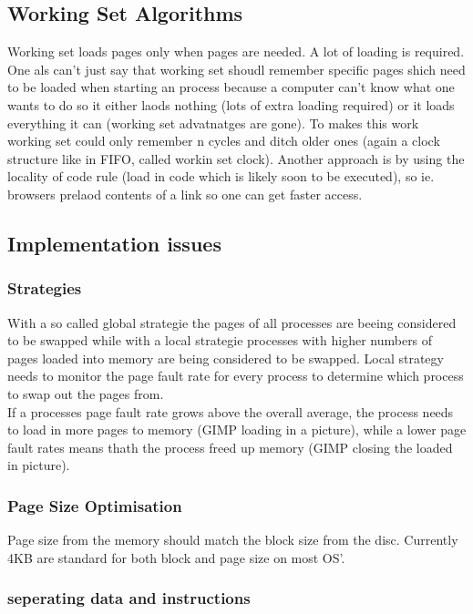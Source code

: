 \documentclass[a4paper]{scrartcl}
\begin{document}
                \subsection{Working Set Algorithms}
                    Working set loads pages only when pages are needed. A lot of loading is required. One als can't just say that working set shoudl remember
                    specific pages shich need to be loaded when starting an process because a computer can't know what one wants to do so it either laods 
                    nothing (lots of extra loading required) or it loads everything it can (working set advatnatges are gone). To makes this work working set could
                    only remember n cycles and ditch older ones (again  a clock structure like in FIFO, called workin set clock). Another approach is by using the 
                    locality of code rule (load in code which is likely soon to be  executed), so ie. browsers prelaod contents of a link so one can get faster access.
                \subsection{Implementation issues}
                    \subsubsection{Strategies}
                    With a so called global strategie the pages of all processes are beeing considered to be swapped while with a local strategie processes with higher
                    numbers of pages loaded into memory are being considered to be swapped. Local strategy needs to monitor the page fault rate for every process to  determine
                    which process to swap out the pages from. \\
                    If a processes page fault rate grows above the overall average, the process needs to load in more pages to memory (GIMP loading in a picture), while
                    a lower page fault rates means thath the process freed up memory (GIMP closing the loaded in picture).
                    \subsubsection{Page Size Optimisation}
                    Page size from the memory should match the block size from the disc. Currently 4KB are standard for both block and page size on most OS'.
                    \subsubsection{seperating data and instructions}                      
\end{document}

